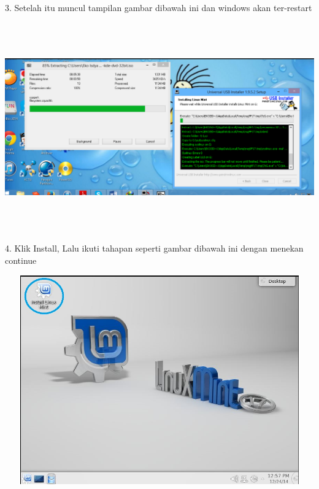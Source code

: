 \documentclass[11pt,fleqn]{book} %
\begin{document}
  \vspace{2cm}
3. Setelah itu muncul tampilan gambar dibawah ini dan windows akan ter-restart\\
\begin{center}
\includegraphics[width=14cm,height=9cm]{ekstrak.png}\\
\end{center}
\vspace{2cm}
4. Klik Install, Lalu ikuti tahapan seperti gambar dibawah ini dengan menekan continue\\
\begin{center}
\includegraphics[width=14cm,height=9cm]{Capture1.JPG}\\
\end{center}
\end{document}
